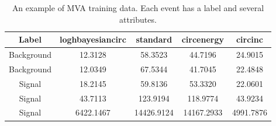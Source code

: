 \documentclass[12pt,twoside,a4paper]{report}
\begin{document}
\begin{table}
\begin{tabular}{| c | c | c | c | c |} 
 \hline
Label & loghbayesiancirc & standard & circenergy & circinc  \\ [0.5ex] 
 \hline\hline
Background & 12.3128 & 58.3523 & 44.7196 & 24.9015 \\ 
 \hline
Background & 12.0349 & 67.5344 & 41.7045 & 22.4848 \\
 \hline
Signal & 18.2145 & 59.8136 & 53.3320 & 22.0601 \\
 \hline
Signal & 43.7113 & 123.9194 & 118.9774 & 43.9234 \\
 \hline
Signal & 6422.1467 & 14426.9124 & 14167.2933 & 4991.7876 \\ [1ex] 
 \hline
 
\end{tabular}
\caption{An example of MVA training data. Each event has a label and several attributes.}
\label{table:1}
\end{table}
\end{document}
